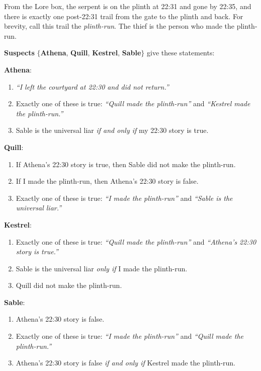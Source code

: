 From the Lore box, the serpent is on the plinth at 22{:}31 and gone by 22{:}35, and there is exactly one post-22{:}31 trail from the gate to the plinth and back.
For brevity, call this trail the \emph{plinth-run}. The thief is the person who made the plinth-run.

\medskip

\textbf{Suspects} \(\{\)\textbf{Athena}, \textbf{Quill}, \textbf{Kestrel}, \textbf{Sable}\(\}\) give these statements:

\medskip

\textbf{Athena}:

\begin{enumerate}[label=(\arabic*)]
\item \emph{``I left the courtyard at 22{:}30 and did not return.''}
\item Exactly one of these is true: \emph{``Quill made the plinth-run''} and \emph{``Kestrel made the plinth-run.''}
\item Sable is the universal liar \emph{if and only if} my 22{:}30 story is true.
\end{enumerate}

\medskip

\textbf{Quill}:

\begin{enumerate}[label=(\arabic*)]
\item If Athena’s 22{:}30 story is true, then Sable did not make the plinth-run.
\item If I made the plinth-run, then Athena’s 22{:}30 story is false.
\item Exactly one of these is true: \emph{``I made the plinth-run''} and \emph{``Sable is the universal liar.''}
\end{enumerate}

\medskip

\textbf{Kestrel}:

\begin{enumerate}[label=(\arabic*)]
\item Exactly one of these is true: \emph{``Quill made the plinth-run''} and \emph{``Athena’s 22{:}30 story is true.''}
\item Sable is the universal liar \emph{only if} I made the plinth-run.
\item Quill did not make the plinth-run.
\end{enumerate}

\medskip

\textbf{Sable}:

\begin{enumerate}[label=(\arabic*)]
\item Athena’s 22{:}30 story is false.
\item Exactly one of these is true: \emph{``I made the plinth-run''} and \emph{``Quill made the plinth-run.''}
\item Athena’s 22{:}30 story is false \emph{if and only if} Kestrel made the plinth-run.
\end{enumerate}

